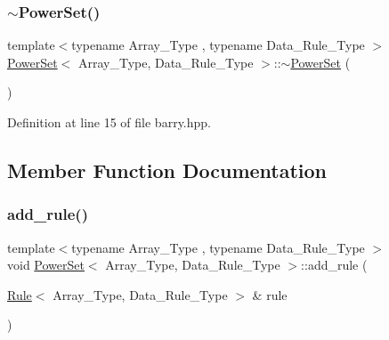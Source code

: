 \mbox{\label{classbarry_1_1_power_set_a89a176c9517e81a066adffad3c46aba5}} 
\subsubsection{\texorpdfstring{$\sim$\+Power\+Set()}{~PowerSet()}}
{\footnotesize\ttfamily template$<$typename Array\+\_\+\+Type , typename Data\+\_\+\+Rule\+\_\+\+Type $>$ \\
\hyperlink{classbarry_1_1_power_set}{Power\+Set}$<$ Array\+\_\+\+Type, Data\+\_\+\+Rule\+\_\+\+Type $>$\+::$\sim$\hyperlink{classbarry_1_1_power_set}{Power\+Set} (\begin{DoxyParamCaption}{ }\end{DoxyParamCaption})\hspace{0.3cm}{\ttfamily [inline]}}



Definition at line 15 of file barry.\+hpp.



\subsection{Member Function Documentation}
\mbox{\label{classbarry_1_1_power_set_a00ee318a40da91bcf0bff79bf71454ab}} 
\subsubsection{\texorpdfstring{add\+\_\+rule()}{add\_rule()}\hspace{0.1cm}{\footnotesize\ttfamily [1/3]}}
{\footnotesize\ttfamily template$<$typename Array\+\_\+\+Type , typename Data\+\_\+\+Rule\+\_\+\+Type $>$ \\
void \hyperlink{classbarry_1_1_power_set}{Power\+Set}$<$ Array\+\_\+\+Type, Data\+\_\+\+Rule\+\_\+\+Type $>$\+::add\+\_\+rule (\begin{DoxyParamCaption}\item[{\hyperlink{classbarry_1_1_rule}{Rule}$<$ Array\+\_\+\+Type, Data\+\_\+\+Rule\+\_\+\+Type $>$ \&}]{rule }\end{DoxyParamCaption})\hspace{0.3cm}{\ttfamily [inline]}}



